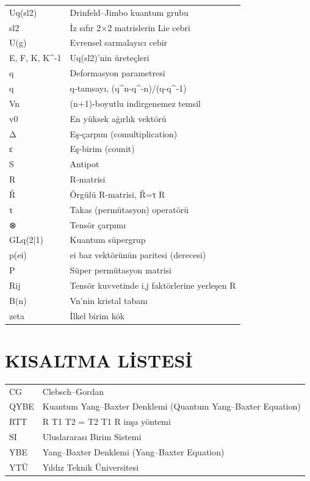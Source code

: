 \documentclass[12pt,a4paper]{report}
\numberwithin{equation}{chapter}
\theoremstyle{plain}
\theoremstyle{definition}
\begin{document}
\noindent
\begin{tabularx}{\textwidth}{@{}p{3.2cm}X@{}}
Uq(sl2) & Drinfeld--Jimbo kuantum grubu \\
sl2 & İz sıfır 2×2 matrislerin Lie cebri \\
U(g) & Evrensel sarmalayıcı cebir \\
E, F, K, K^-1 & Uq(sl2)'nin üreteçleri \\
q & Deformasyon parametresi \\
[n]q & q-tamsayı, (q^n-q^-n)/(q-q^-1) \\
Vn & (n+1)-boyutlu indirgenemez temsil \\
v0 & En yüksek ağırlık vektörü \\
Δ & Eş-çarpım (comultiplication) \\
ε & Eş-birim (counit) \\
S & Antipot \\
R & R-matrisi \\
Ř & Örgülü R-matrisi, Ř=τ R \\
τ & Takas (permütasyon) operatörü \\
⊗ & Tensör çarpımı \\
GLq(2|1) & Kuantum süpergrup \\
p(ei) & ei baz vektörünün paritesi (derecesi) \\
P & Süper permütasyon matrisi \\
Rij & Tensör kuvvetinde i,j faktörlerine yerleşen R \\
B(n) & Vn'nin kristal tabanı \\
zeta & İlkel birim kök \\
\end{tabularx}

\clearpage

\chapter{KISALTMA LİSTESİ}

\noindent
\begin{tabularx}{\textwidth}{@{}p{3.2cm}X@{}}
CG    & Clebsch--Gordan \\
QYBE  & Kuantum Yang--Baxter Denklemi (Quantum Yang--Baxter Equation) \\
RTT   & R T1 T2 = T2 T1 R inşa yöntemi \\
SI    & Uluslararası Birim Sistemi \\
YBE   & Yang--Baxter Denklemi (Yang--Baxter Equation) \\
YTÜ   & Yıldız Teknik Üniversitesi \\
\end{tabularx}
\end{document}

